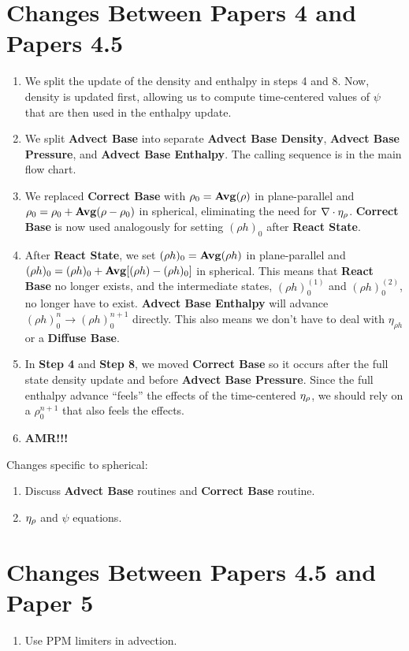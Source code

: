 \section{Changes Between Papers 4 and Papers 4.5}
\begin{enumerate}
\item We split the update of the density and enthalpy in steps 4 and 8.
Now, density is updated first, allowing us to compute time-centered values of 
$\psi$ that are then used in the enthalpy update.
\item We split {\bf Advect Base} into separate {\bf Advect Base Density},
{\bf Advect Base Pressure}, and {\bf Advect Base Enthalpy}.  The calling sequence
is in the main flow chart.
\item We replaced {\bf Correct Base} with $\rho_0 = {\rm{\bf Avg}}(\rho)$ in 
plane-parallel and $\rho_0 = \rho_0 + {\rm{\bf Avg}}(\rho - \rho_0)$ in spherical,
eliminating the need for $\nabla\cdot\eta_{\rho}$.  {\bf Correct Base} is now used
analogously for setting $(\rho h)_0$ after {\bf React State}.
\item After {\bf React State}, we set $(\rho h)_0 = {\rm{\bf Avg}}(\rho h)$ in 
plane-parallel and $(\rho h)_0 = (\rho h)_0 + {\rm{\bf Avg}}[(\rho h) - (\rho h)_0]$ 
in spherical.  This means that {\bf React Base} no longer exists, and the intermediate 
states, $(\rho h)_0^{(1)}$ and $(\rho h)_0^{(2)}$, no longer have to exist.  
{\bf Advect Base Enthalpy} will advance $(\rho h)_0^n \rightarrow (\rho h)_0^{n+1}$ 
directly.  This also means we don't have to deal with $\eta_{\rho h}$ or a 
{\bf Diffuse Base}.
\item In {\bf Step 4} and {\bf Step 8}, we moved {\bf Correct Base} so it
occurs after the full state density update and  before {\bf Advect Base Pressure}.  
Since the full enthalpy advance ``feels'' the effects of the time-centered $\eta_{\rho}$, 
we should rely on a $\rho_0^{n+1}$ that also feels the effects.
\item {\bf AMR!!!}
\end{enumerate}
Changes specific to spherical:
\begin{enumerate}
\item Discuss {\bf Advect Base} routines and {\bf Correct Base} routine.
\item $\eta_{\rho}$ and $\psi$ equations.
\end{enumerate}
\section{Changes Between Papers 4.5 and Paper 5}
\begin{enumerate}
\item Use PPM limiters in advection.
\end{enumerate}
